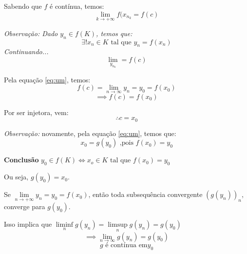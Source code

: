 \documentclass[12pt]{article}
\begin{document}
    Sabendo que $f$ é contínua, temos:
    \begin{equation*}
        \lim \limits_{k \to + \infty} f(x_{n_k} = f(c)
    \end{equation*}

    \textit{Observação: Dado $y_n \in f(K)$, temos que: }
    \begin{equation*}
        \exists ! x_n \in K \text{ tal que } y_n = f(x_n)
    \end{equation*}
    \textit{Continuando...}
    \begin{equation*}
        \lim \limits_{y_{n_k}} = f(c)
    \end{equation*}

    Pela equação \ref{eq:um}, temos:
    \begin{equation*}
        f(c) = \lim \limits_{n \to \infty} y_n = y_0 = f(x_0)
    \end{equation*}
    \begin{equation*}
        \implies f(c) = f(x_0) 
    \end{equation*}

    Por ser injetora, vem:
    \begin{equation*}
        \therefore c = x_0 
    \end{equation*}

    \textit{Observação: } novamente, pela equação \ref{eq:um}, temos que:
    \begin{equation*}
        x_0 = g(y_0) \text{ ,pois } f(x_0) = y_0
    \end{equation*}
    
    \textbf{Conclusão}
    $y_0 \in f(K) \iff x_o \in K \text{ tal que } f(x_0) = y_0$

    Ou seja, $g(y_0) = x_0$.

    Se $\lim \limits_{n \to + \infty} y_n = y_0 = f(x_0)$, então toda subsequência convergente $\left( g(y_n)\right)_n$, converge para $g(y_0)$. 

    Isso implica que $\liminf \limits_{n} g(y_n) = \limsup \limits_{n} g(y_n) = g(y_0)$
    \begin{equation*}
        \implies \lim \limits_{n \to \infty} g(y_n) = g(y_0)
    \end{equation*}
    \begin{equation*}
        g \text{ é contínua em} y_0
    \end{equation*}
\end{document}
